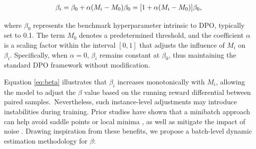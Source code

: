 \begin{eqnarray}
    \begin{aligned}
        \beta_i = \beta_0 + \alpha \large(M_i - M_0 \large) \beta_0 = [1 + \alpha(M_i-M_0)]\beta_0,
    \end{aligned}
    \label{eq:beta}
\end{eqnarray}

where $\beta_0$ represents the benchmark hyperparameter intrinsic to DPO, typically set to 0.1. The term $M_0$ denotes a predetermined threshold, and the coefficient $\alpha$ is a scaling factor within the interval $[0, 1]$ that adjusts the influence of $M_i$ on $\beta_i$. Specifically, when $\alpha = 0$, $\beta_i$ remains constant at $\beta_0$, thus maintaining the standard DPO framework without modification.

Equation \eqref{eq:beta} illustrates that $\beta_i$ increases monotonically with $M_i$, allowing the model to adjust the $\beta$ value based on the running reward differential between paired samples.\
Nevertheless, such instance-level adjustments may introduce instabilities during training. Prior studies have shown that a minibatch approach can help avoid saddle points or local minima \cite{ge2015escaping}, as well as mitigate the impact of noise \cite{robbins1951stochastic, bottou2010large}. Drawing inspiration from these benefits, we propose a batch-level dynamic estimation methodology for $\beta$:

